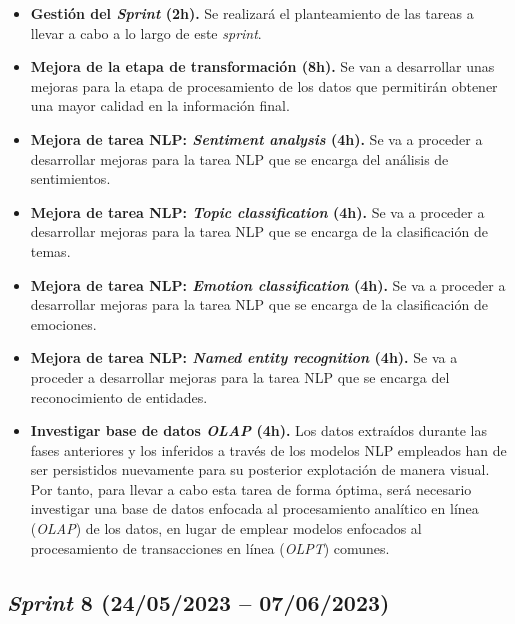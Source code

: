 \begin{itemize}

    \item \textbf{Gestión del \textit{Sprint} (2h).} Se realizará el planteamiento de las tareas a llevar a cabo a lo largo de este \textit{sprint}.

    \item \textbf{Mejora de la etapa de transformación (8h).} Se van a desarrollar unas mejoras para la etapa de procesamiento de los datos que permitirán obtener una mayor calidad en la información final.

    \item \textbf{Mejora de tarea NLP: \textit{Sentiment analysis} (4h).} Se va a proceder a desarrollar mejoras para la tarea NLP que se encarga del análisis de sentimientos.

    \item \textbf{Mejora de tarea NLP: \textit{Topic classification} (4h).} Se va a proceder a desarrollar mejoras para la tarea NLP que se encarga de la clasificación de temas.

    \item \textbf{Mejora de tarea NLP: \textit{Emotion classification} (4h).} Se va a proceder a desarrollar mejoras para la tarea NLP que se encarga de la clasificación de emociones.

    \item \textbf{Mejora de tarea NLP: \textit{Named entity recognition} (4h).} Se va a proceder a desarrollar mejoras para la tarea NLP que se encarga del reconocimiento de entidades.

    \item \textbf{Investigar base de datos \textit{OLAP} (4h).} Los datos extraídos durante las fases anteriores y los inferidos a través de los modelos NLP empleados han de ser persistidos nuevamente para su posterior explotación de manera visual. Por tanto, para llevar a cabo esta tarea de forma óptima, será necesario investigar una base de datos enfocada al procesamiento analítico en línea (\textit{OLAP}) de los datos, en lugar de emplear modelos enfocados al procesamiento de transacciones en línea (\textit{OLPT}) comunes.

\end{itemize}



\subsection{\textit{Sprint} 8 (24/05/2023 -- 07/06/2023)}


